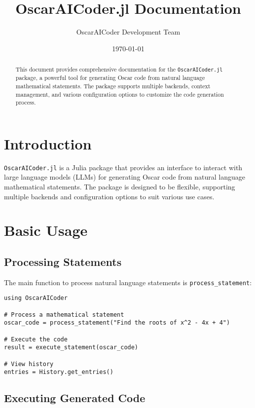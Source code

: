 \documentclass[11pt,a4paper]{article}
\title{OscarAICoder.jl Documentation}
\author{OscarAICoder Development Team}
\date{\today}
\newcommand{\func}[1]{\texttt{#1}}
\newcommand{\modname}[1]{\texttt{#1}}
\begin{document}
\maketitle
\thispagestyle{empty}

\begin{abstract}
  This document provides comprehensive documentation for the
  \modname{OscarAICoder.jl} package, a powerful tool for generating Oscar code
  from natural language mathematical statements. The package supports multiple
  backends, context management, and various configuration options to customize
  the code generation process.
\end{abstract}

\section{Introduction}
\label{sec:introduction}

\modname{OscarAICoder.jl} is a Julia package that provides an interface to interact with large language models (LLMs) for generating Oscar code from natural language mathematical statements. The package is designed to be flexible, supporting multiple backends and configuration options to suit various use cases.

\section{Basic Usage}
\label{sec:basic_usage}

\subsection{Processing Statements}

The main function to process natural language statements is \func{process\_statement}:

\begin{lstlisting}
using OscarAICoder

# Process a mathematical statement
oscar_code = process_statement("Find the roots of x^2 - 4x + 4")

# Execute the code
result = execute_statement(oscar_code)

# View history
entries = History.get_entries()
\end{lstlisting}

\subsection{Executing Generated Code}
\label{sec:executing_code}
\end{document}
